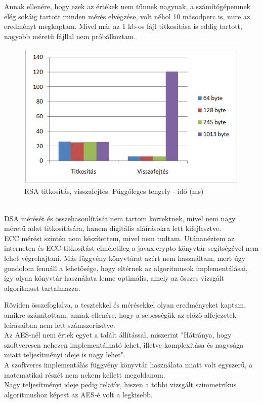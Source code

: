 \noindent Annak ellenére, hogy ezek az értékek nem  tűnnek nagynak, a számítógépemnek elég sokáig tartott minden mérés elvégzése, volt néhol 10 másodperc is, mire az eredményt megkaptam. Mivel már az 1 kb-os fájl titkosítása is eddig tartott, nagyobb méretű fájllal nem próbálkoztam.
\begin{figure}[h]
	\centering
	\includegraphics[scale=0.8]{images/alg_graf_4.png}
	\caption{RSA titkosítás, visszafejtés. Függőleges tengely - idő (ms)}
	\label{fig:rsa_graf}
\end{figure}
\\ \noindent DSA mérését és összehasonlítását nem tartom korrektnek, mivel nem nagy méretű adat titkosítására, hanem digitális aláírásokra lett kifejlesztve.
\vspace{5pt}\\ECC mérést szintén nem készítettem, mivel nem tudtam. Utánanéztem az interneten és ECC titkosítást elméletileg a javax.crypto könyvtár segítségével nem lehet végrehajtani. Más függvény könyvtárat azért nem használtam, mert úgy gondolom fennáll a lehetősége, hogy eltérnek az algoritmusok implementálásai, így olyan könyvtár használata lenne optimális, amely az összes vizsgált algoritmust tartalmazza.



\vspace{15pt}\noindent Röviden összefoglalva, a tesztekkel és mérésekkel olyan eredményeket kaptam, amikre számítottam, annak ellenére, hogy a sebességük az előző alfejezetek leírásaiban nem lett számszerűsítve. 
\\Az AES-nél nem értek egyet a talált állítással, miszerint "Hátránya, hogy szoftveresen nehezen implementálható lehet, illetve komplexitása és nagysága miatt teljesítményi ideje is nagy lehet".
\\A szoftveres implementálás függvény könyvtár használata miatt volt egyszerű, a matematikai részét nem nekem kellett megoldanom.
\\Nagy teljesítményi ideje pedig relatív, hiszen a többi vizsgált szimmetrikus algoritmushoz képest az AES-é volt a legkisebb.